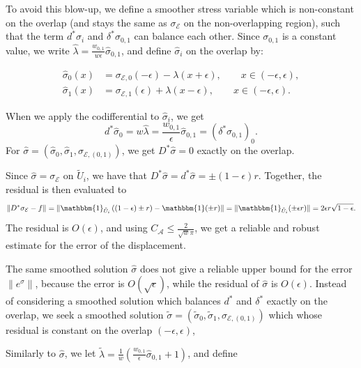 \documentclass[reqno]{amsart}
\numberwithin{equation}{section}
\theoremstyle{definition}
\newcommand{\Ac}{\mathcal{A}}
\newcommand{\Ec}{\mathcal{E}}
\begin{document}
To avoid this blow-up, we define a smoother stress variable which is non-constant on the overlap (and stays the same as $\sigma_\Ec$ on the non-overlapping region), such that the term $d^* \sigma_i$ and $\delta^*\sigma_{0,1}$ can balance each other. Since $\sigma_{0,1}$ is a constant value, we write $\hat\lambda = \frac{w_{0,1}}{w\epsilon}\hat{\sigma}_{0,1}$, and define $\hat\sigma_i$ on the overlap by:

\begin{subequations}    
\begin{align}
\hat{\sigma}_0(x) &= \sigma_{\Ec,0}(-\epsilon) - \lambda(x+\epsilon), \qquad x \in (-\epsilon, \epsilon), \\
\hat{\sigma}_1(x) &= \sigma_{\Ec,1}(\epsilon) + \lambda(x-\epsilon), \qquad x \in (-\epsilon, \epsilon).
\end{align}
\end{subequations}

When we apply the codifferential to $\hat\sigma_i$, we get
\begin{equation}
d^*\hat\sigma_0 = w\hat\lambda =\frac{w_{0,1}}{\epsilon}\hat{\sigma}_{0,1} = (\delta^*\sigma_{0,1})_0.
\end{equation}
For $\hat\sigma = (\hat\sigma_0, \hat\sigma_1, \sigma_{\Ec, (0,1)})$, we get $D^*\hat\sigma = 0$ exactly on the overlap.

Since $\hat\sigma = \sigma_\Ec$ on $\tilde{U}_i$, we have that $D^*\hat\sigma = d^*\hat\sigma = \pm (1-\epsilon) r$. Together, the residual is then evaluated to
\begin{equation}
\|D^*\sigma_{\Ec} - f \| = \|\mathbbm{1}_{\tilde{U}_i} \left( (1-\epsilon) \pm r \right) -\mathbbm{1} (\pm r) \| = \|\mathbbm{1}_{\tilde{U}_i} (\pm \epsilon r)\| = 2\epsilon r \sqrt{1-\epsilon}. 
\end{equation}
The residual is $O(\epsilon)$, and using $C_{\Ac} \leq \frac{2}{\sqrt{w} \pi}$, we get a reliable and robust estimate for the error of the displacement.


The same smoothed solution $\hat\sigma$ does not give a reliable upper bound for the error $\|e^\sigma\|$, because the error is $O(\sqrt{\epsilon})$, while the residual of $\hat\sigma$ is $O(\epsilon)$. Instead of considering a smoothed solution which balances $d^*$ and $\delta^*$ exactly on the overlap, we seek a smoothed solution $\tilde{\sigma} = (\tilde{\sigma}_0, \tilde{\sigma}_1, \sigma_{\Ec, (0,1)})$ which whose residual is constant on the overlap $(-\epsilon, \epsilon)$, 

Similarly to $\hat\sigma$, we let $\tilde\lambda = \frac{1}{w}(\frac{w_{0,1}}{\epsilon}\hat{\sigma}_{0,1} +1)$, and define
\end{document}
